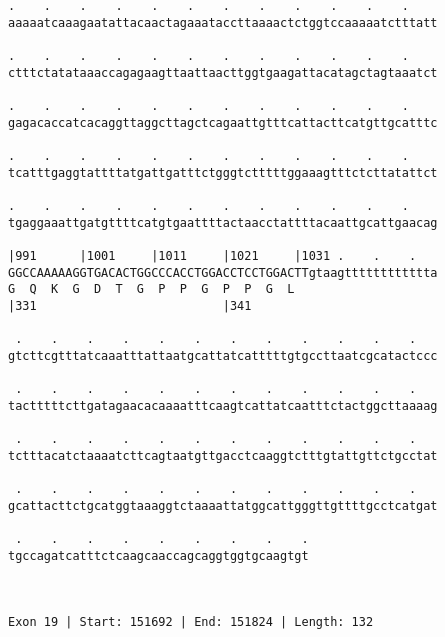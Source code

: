 \documentclass{article}
\begin{document}
\begin{Verbatim}
.    .    .    .    .    .    .    .    .    .    .    .    
aaaaatcaaagaatattacaactagaaataccttaaaactctggtccaaaaatctttatt
                                                            
.    .    .    .    .    .    .    .    .    .    .    .    
ctttctatataaaccagagaagttaattaacttggtgaagattacatagctagtaaatct
                                                            
.    .    .    .    .    .    .    .    .    .    .    .    
gagacaccatcacaggttaggcttagctcagaattgtttcattacttcatgttgcatttc
                                                            
.    .    .    .    .    .    .    .    .    .    .    .    
tcatttgaggtattttatgattgatttctgggtctttttggaaagtttctcttatattct
                                                            
.    .    .    .    .    .    .    .    .    .    .    .    
tgaggaaattgatgttttcatgtgaattttactaacctattttacaattgcattgaacag
                                                            
|991      |1001     |1011     |1021     |1031 .    .    .   
GGCCAAAAAGGTGACACTGGCCCACCTGGACCTCCTGGACTTgtaagtttttttttttta
G  Q  K  G  D  T  G  P  P  G  P  P  G  L                    
|331                          |341                          
  
 .    .    .    .    .    .    .    .    .    .    .    .   
gtcttcgtttatcaaatttattaatgcattatcatttttgtgccttaatcgcatactccc
                                                            
 .    .    .    .    .    .    .    .    .    .    .    .   
tactttttcttgatagaacacaaaatttcaagtcattatcaatttctactggcttaaaag
                                                            
 .    .    .    .    .    .    .    .    .    .    .    .   
tctttacatctaaaatcttcagtaatgttgacctcaaggtctttgtattgttctgcctat
                                                            
 .    .    .    .    .    .    .    .    .    .    .    .   
gcattacttctgcatggtaaaggtctaaaattatggcattgggttgttttgcctcatgat
                                                            
 .    .    .    .    .    .    .    .    .
tgccagatcatttctcaagcaaccagcaggtggtgcaagtgt
                                          
                                          
 
Exon 19 | Start: 151692 | End: 151824 | Length: 132
 

\end{Verbatim}
\end{document}
